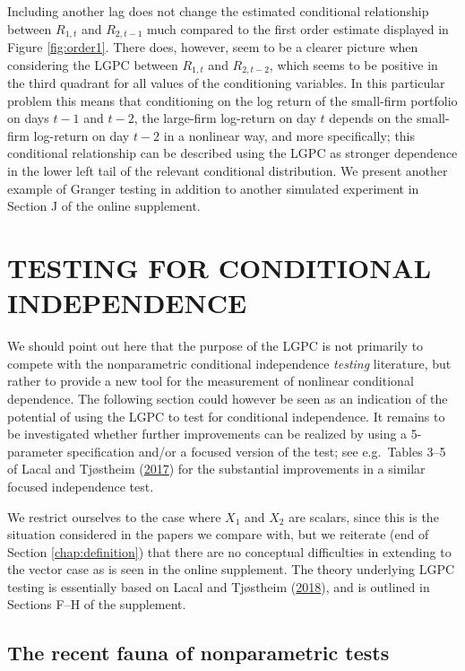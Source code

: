 \documentclass[
  12pt,
  letterpaper]{article}
\theoremstyle{definition}
\theoremstyle{definition}
\theoremstyle{definition}
\theoremstyle{remark}
\begin{document}
Including another lag does not change the estimated conditional relationship between \(R_{1,t}\) and \(R_{2,t-1}\) much compared to the first order estimate displayed in Figure \ref{fig:order1}. There does, however, seem to be a clearer picture when considering the LGPC between \(R_{1,t}\) and \(R_{2,t-2}\), which seems to be positive in the third quadrant for all values of the conditioning variables. In this particular problem this means that conditioning on the log return of the small-firm portfolio on days \(t-1\) and \(t-2\), the large-firm log-return on day \(t\) depends on the small-firm log-return on day \(t-2\) in a nonlinear way, and more specifically; this conditional relationship can be described using the LGPC as stronger dependence in the lower left tail of the relevant conditional distribution. We present another example of Granger testing in addition to another simulated experiment in Section J of the online supplement.

\hypertarget{chap:testing}{%
\section{TESTING FOR CONDITIONAL INDEPENDENCE}\label{chap:testing}}

We should point out here that the purpose of the LGPC is not primarily to compete with the nonparametric conditional independence \emph{testing} literature, but rather to provide a new tool for the measurement of nonlinear conditional dependence. The following section could however be seen as an indication of the potential of using the LGPC to test for conditional independence. It remains to be investigated whether further improvements can be realized by using a 5-parameter specification and/or a focused version of the test; see e.g.~Tables 3--5 of Lacal and Tjøstheim (\protect\hyperlink{ref-lacal2017local}{2017}) for the substantial improvements in a similar focused independence test.

We restrict ourselves to the case where \(X_1\) and \(X_2\) are scalars, since this is the situation considered in the papers we compare with, but we reiterate (end of Section \ref{chap:definition}) that there are no conceptual difficulties in extending to the vector case as is seen in the online supplement. The theory underlying LGPC testing is essentially based on Lacal and Tjøstheim (\protect\hyperlink{ref-lacal2018estimating}{2018}), and is outlined in Sections F--H of the supplement.

\hypertarget{fauna}{%
\subsection{The recent fauna of nonparametric tests}\label{fauna}}
\end{document}
